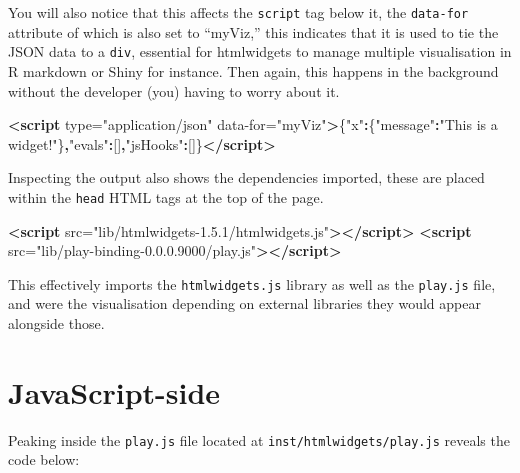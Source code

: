 \documentclass[
]{krantz}
\makeatletter
\newenvironment{Shaded}{\begin{snugshade}}{\end{snugshade}}
\newcommand{\KeywordTok}[1]{\textcolor[rgb]{0.27,0.27,0.27}{\textbf{#1}}}
\newcommand{\NormalTok}[1]{#1}
\newcommand{\OperatorTok}[1]{\textcolor[rgb]{0.43,0.43,0.43}{\textbf{#1}}}
\newcommand{\OtherTok}[1]{\textcolor[rgb]{0.37,0.37,0.37}{#1}}
\newcommand{\StringTok}[1]{\textcolor[rgb]{0.5,0.5,0.5}{#1}}
\newenvironment{kframe}{%
\medskip{}
\setlength{\fboxsep}{.8em}
 \def\at@end@of@kframe{}%
 \ifinner\ifhmode%
  \def\at@end@of@kframe{\end{minipage}}%
  \begin{minipage}{\columnwidth}%
 \fi\fi%
 \def\FrameCommand##1{\hskip\@totalleftmargin \hskip-\fboxsep
 \colorbox{shadecolor}{##1}\hskip-\fboxsep
     \hskip-\linewidth \hskip-\@totalleftmargin \hskip\columnwidth}%
 \MakeFramed {\advance\hsize-\width
   \@totalleftmargin\z@ \linewidth\hsize
   \@setminipage}}%
 {\par\unskip\endMakeFramed%
 \at@end@of@kframe}
\renewenvironment{Shaded}{\begin{kframe}}{\end{kframe}}
\makeatother
\begin{document}
You will also notice that this affects the \texttt{script} tag below it, the \texttt{data-for} attribute of which is also set to ``myViz,'' this indicates that it is used to tie the JSON data to a \texttt{div}, essential for htmlwidgets to manage multiple visualisation in R markdown or Shiny for instance. Then again, this happens in the background without the developer (you) having to worry about it.

\begin{Shaded}
\begin{Highlighting}[]
\KeywordTok{\textless{}script}\OtherTok{ type=}\StringTok{"application/json"}\OtherTok{ data{-}for=}\StringTok{"myViz"}\KeywordTok{\textgreater{}}\NormalTok{\{}\StringTok{"x"}\OperatorTok{:}\NormalTok{\{}\StringTok{"message"}\OperatorTok{:}\StringTok{"This is a widget!"}\NormalTok{\}}\OperatorTok{,}\StringTok{"evals"}\OperatorTok{:}\NormalTok{[]}\OperatorTok{,}\StringTok{"jsHooks"}\OperatorTok{:}\NormalTok{[]\}}\KeywordTok{\textless{}/script\textgreater{}}
\end{Highlighting}
\end{Shaded}

Inspecting the output also shows the dependencies imported, these are placed within the \texttt{head} HTML tags at the top of the page.

\begin{Shaded}
\begin{Highlighting}[]
\KeywordTok{\textless{}script}\OtherTok{ src=}\StringTok{"lib/htmlwidgets{-}1.5.1/htmlwidgets.js"}\KeywordTok{\textgreater{}\textless{}/script\textgreater{}}
\KeywordTok{\textless{}script}\OtherTok{ src=}\StringTok{"lib/play{-}binding{-}0.0.0.9000/play.js"}\KeywordTok{\textgreater{}\textless{}/script\textgreater{}}
\end{Highlighting}
\end{Shaded}

This effectively imports the \texttt{htmlwidgets.js} library as well as the \texttt{play.js} file, and were the visualisation depending on external libraries they would appear alongside those.

\hypertarget{javascript-side}{%
\section*{JavaScript-side}\label{javascript-side}}


Peaking inside the \texttt{play.js} file located at \texttt{inst/htmlwidgets/play.js} reveals the code below:
\end{document}

